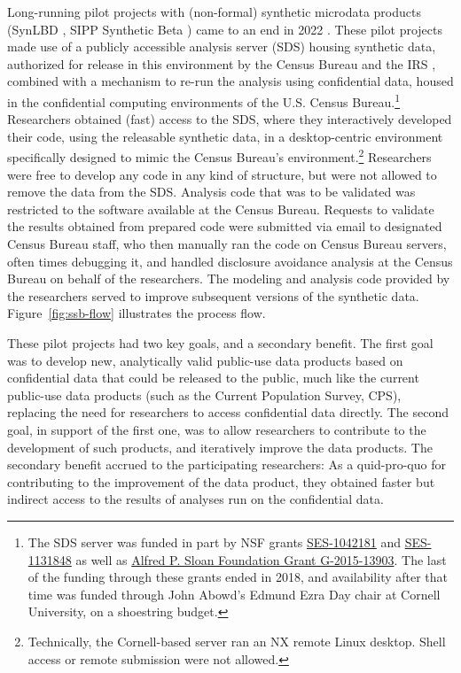 \documentclass[inline]{hdsr}
\begin{document}
Long-running pilot projects with (non-formal) synthetic microdata products (SynLBD \citep{KinneyEtAl2011,us_census_bureau_synthetic_2011,vilhuber_codebook_2013}, SIPP Synthetic Beta \citep{Benedettoetal_2013,us_census_bureau_sipp_2015,reeder_codebook_2018}) came to an end in 2022 \citep{vilhuber_end_2022}. These pilot projects made use of a publicly accessible analysis server  (\acf{SDS}) housing synthetic data, authorized for release in this environment by the Census Bureau and the IRS \citep[e.g.][]{us_census_bureau_disclosure_2015}, combined with a mechanism to re-run the analysis using confidential data, housed in the confidential computing environments of the U.S. Census Bureau.\footnote{The \ac{SDS} server was funded in part by NSF grants \href{http://www.nsf.gov/awardsearch/showAward.do?AwardNumber=1042181}{SES-1042181} and \href{http://www.nsf.gov/awardsearch/showAward.do?AwardNumber=1131848}{SES-1131848} as well as \href{https://sloan.org/grant-detail/6845}{Alfred P. Sloan Foundation Grant G-2015-13903}. The last of the funding through these grants ended in 2018, and availability after that time was funded through John Abowd's Edmund Ezra Day chair at Cornell University, on a shoestring budget.} Researchers obtained (fast) access to the \ac{SDS}, where they interactively developed their code, using the releasable synthetic data, in a desktop-centric environment specifically designed to mimic the Census Bureau's environment.\footnote{Technically, the Cornell-based server ran an NX remote Linux desktop. Shell access or remote submission were not allowed.} Researchers were free to develop any code in any kind of structure, but were not allowed to remove the data from the \ac{SDS}. Analysis code that was to be validated was restricted to the software available at the Census Bureau. Requests to validate the results obtained from prepared code were submitted via email to designated Census Bureau staff, who then manually ran the code on Census Bureau servers, often times debugging it, and handled disclosure avoidance analysis at the Census Bureau on behalf of the researchers. The modeling and analysis code provided by the researchers served to improve subsequent versions of the synthetic data. Figure~\ref{fig:ssb-flow} illustrates the process flow.

These pilot projects had two key goals, and a secondary benefit. The first goal was to develop new, analytically valid public-use data products based on confidential data that could be released to the public, much like the current public-use data products (such as the Current Population Survey, CPS), replacing the need for researchers to access confidential data directly. The second goal, in support of the first one, was to allow researchers to contribute to the development of such products, and iteratively improve the data products. The secondary benefit accrued to the participating researchers: As a quid-pro-quo for contributing to the improvement of the data product, they obtained faster but indirect access to the results of analyses run on the confidential data. 
\end{document}
